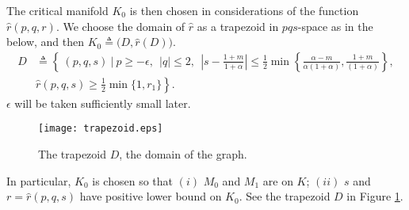 \documentclass[a4paper,11pt]{article}
\theoremstyle{remark}
\begin{document}
The critical manifold $K_0$ is then chosen in considerations of the function $\hat{r}(p,q,r)$. We choose the domain of $\hat{r}$ as a trapezoid in $pqs$-space as in the below, and then $K_0\triangleq\big(D,\hat{r}(D)\big)$.
\begin{align*}
 D &\triangleq \left\{ \: (p,q,s) \: \Big| \:  p\ge-\epsilon, ~~ |q|\le2, ~~ \left|s-\frac{1+m}{1+\alpha}\right| \le \frac{1}{2}\min\left\{\frac{\alpha-m}{\alpha(1+\alpha)},\frac{1+m}{(1+\alpha)}\right\},\right.  \\
 &\left. \hat{r}(p,q,s)\ge \frac{1}{2}\min\{1,r_1\}\right\}.
\end{align*}
$\epsilon$ will be taken sufficiently small later.
\begin{figure}[ht]
 \centering
  \texttt{[image: trapezoid.eps]}
  \caption{The trapezoid $D$, the domain of the graph.} \label{fig:D}
\end{figure}
In particular, $K_0$ is chosen so that $(i)$ $M_0$ and $M_1$ are on $K$; $(ii)$ $s$ and $r=\hat{r}(p,q,s)$ have positive lower bound on $K_0$. See the trapezoid $D$ in Figure \ref{fig:D}. 
\end{document}
